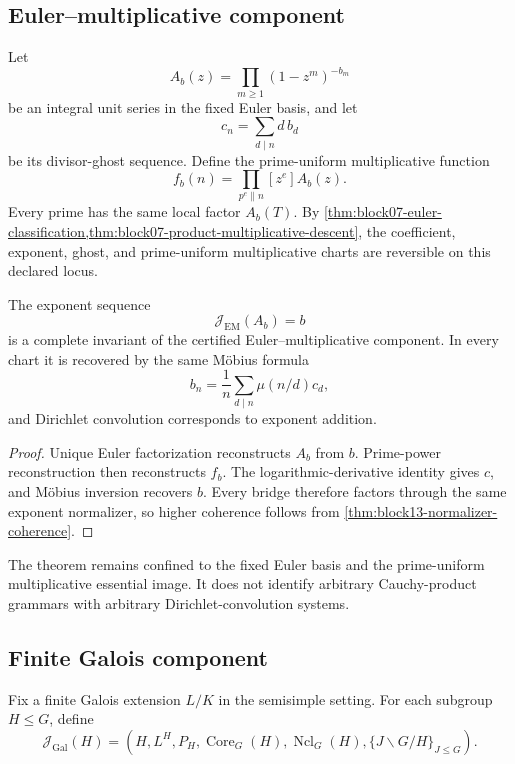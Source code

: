 \subsection{Euler--multiplicative component}
\label{subsec:block13-em}

Let
\[
 A_b(z)=\prod_{m\geq1}(1-z^m)^{-b_m}
\]
be an integral unit series in the fixed Euler basis, and let
\[
 c_n=\sum_{d\mid n}d\,b_d
\]
be its divisor-ghost sequence.  Define the prime-uniform multiplicative function
\[
 f_b(n)=\prod_{p^e\parallel n}[z^e]A_b(z).
\]
Every prime has the same local factor \(A_b(T)\).  By \cref{thm:block07-euler-classification,thm:block07-product-multiplicative-descent}, the coefficient, exponent, ghost, and prime-uniform multiplicative charts are reversible on this declared locus.

\begin{theorem}
\label{thm:block13-em-comparison}
The exponent sequence
\[
 \mathcal J_{\mathrm{EM}}(A_b)=b
\]
is a complete invariant of the certified Euler--multiplicative component.  In every chart it is recovered by the same M\"obius formula
\[
 b_n
 =
 \frac1n
 \sum_{d\mid n}\mu(n/d)c_d,
\]
and Dirichlet convolution corresponds to exponent addition.
\end{theorem}

\begin{proof}
Unique Euler factorization reconstructs \(A_b\) from \(b\).  Prime-power reconstruction then reconstructs \(f_b\).  The logarithmic-derivative identity gives \(c\), and M\"obius inversion recovers \(b\).  Every bridge therefore factors through the same exponent normalizer, so higher coherence follows from \cref{thm:block13-normalizer-coherence}.
\end{proof}

The theorem remains confined to the fixed Euler basis and the prime-uniform multiplicative essential image.  It does not identify arbitrary Cauchy-product grammars with arbitrary Dirichlet-convolution systems.

\subsection{Finite Galois component}
\label{subsec:block13-gal}

Fix a finite Galois extension \(L/K\) in the semisimple setting.  For each subgroup \(H\leq G\), define
\[
 \mathcal J_{\mathrm{Gal}}(H)
 =
 \left(
 H,
 L^H,
 P_H,
 \operatorname{Core}_G(H),
 \operatorname{Ncl}_G(H),
 \{J\backslash G/H\}_{J\leq G}
 \right).
\]

